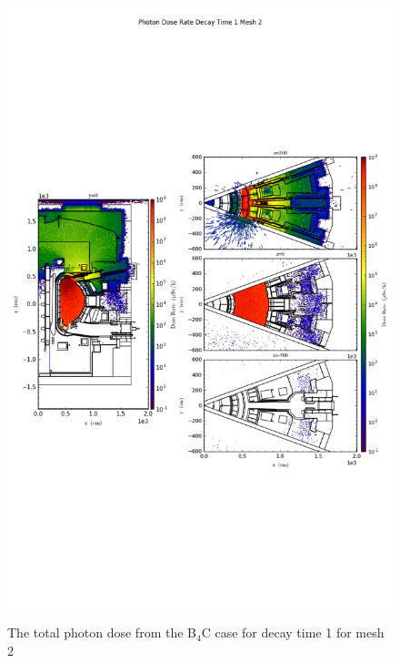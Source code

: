 \begin{figure}[ht!]
\centering
\includegraphics[trim={0cm 9cm 0cm 10cm},clip,scale=0.75]{../plots/final_model_with_b4c/Photon_Dose_Rate_Decay_Time_1_Mesh_2.png}
\label{fig:photons_dc1_no4bc_m2_flux}
\caption{The total photon dose from the B$_4$C case for decay time 1 for mesh 2}
\end{figure}

